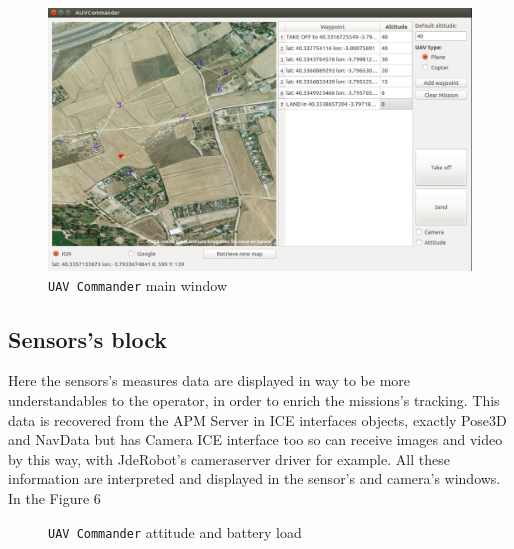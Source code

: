 \documentclass{llncs}
\begin{document}
\begin{figure}
  \centering
  \includegraphics[scale=0.33]{img/uavc_mission.png}
  \caption{\texttt{UAV Commander} main window}
  \label{fig:uavc_ppal}
\end{figure}

\subsection{Sensors's block}
\label{sensors_block}

Here the sensors's measures data are displayed in way to be more understandables to the operator, in order to enrich the missions's tracking. This data is recovered from the APM Server in ICE interfaces objects, exactly Pose3D and NavData but has Camera ICE interface too so can receive images and video by this way, with JdeRobot's cameraserver driver for example. All these information are interpreted and displayed in the sensor's and camera's windows.
In the Figure 6 

\begin{figure}
    \caption{\texttt{UAV Commander} attitude and battery load}
  
\end{figure}
\end{document}
